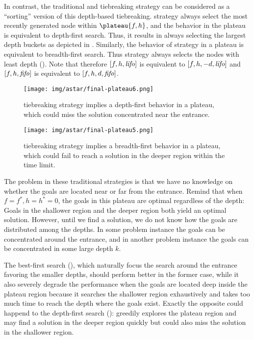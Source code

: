 In contrast, the traditional \lifo and \fifo tiebreaking strategy can be
considered as a ``sorting'' version of this depth-based tiebreaking.
\lifo strategy always select the most recently generated node
within $\plateau{f,h}$, and the behavior in the plateau is equivalent to depth-first search.
Thus, it results in always selecting the largest depth
buckets as depicted in .
Similarly, the behavior of \fifo strategy 
in a plateau is equivalent to breadth-first search. Thus \fifo strategy
always selects the nodes with least depth ().
Note that therefore $[f,h,{\text{\textit{lifo}}}]$ is equivalent to $[f,h,-d,{\text{\textit{lifo}}}]$ and
$[f,h,{\text{\textit{fifo}}}]$ is equivalent to $[f,h,d,{\text{\textit{fifo}}}]$.

\begin{figure}[htbp]
 \centering
 \texttt{[image: img/astar/final-plateau6.png]}
 \caption{\lifo tiebreaking strategy implies a depth-first behavior in a
 plateau, which could miss the solution concentrated near the entrance.}
 \label{fig:plateau-depiction-lifo}
\end{figure}

\begin{figure}[htbp]
 \centering
 \texttt{[image: img/astar/final-plateau5.png]}
 \caption{\fifo tiebreaking strategy implies a breadth-first behavior in a
 plateau, which could fail to reach a solution in the deeper region
 within the time limit.}
 \label{fig:plateau-depiction-fifo}
\end{figure}

The problem in these traditional strategies is that we have no knowledge
on whether the goals are located near or far from the entrance. Remind
that when $f=f^*, h=h^*=0$, the goals in this plateau are optimal
regardless of the depth: Goals in the shallower region and the deeper
region both yield an optimal solution. However, until we find a
solution, we do not know how the goals are distributed among the
depths. In some problem instance the goals can be concentrated around
the entrance, and in another problem instance the goals can be
concentrated in some large depth $k$.


The best-first search (\fifo), which naturally focus the search around
the entrance favoring the smaller depths, should perform better in the
former case, while it also severely degrade the performance when the
goals are located deep inside the plateau region because it searches the
shallower region exhaustively and takes too much time to reach the depth
where the goals exist.
Exactly the opposite could happend to the depth-first search (\lifo):
\lifo greedily explores the
plateau region and may find a solution in the deeper region quickly but
could also miss the solution in the shallower region.

